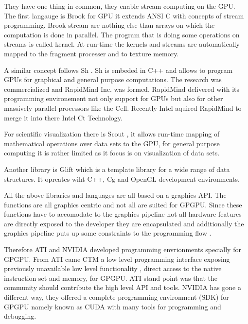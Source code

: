 They have one thing in common, they enable stream computing on the \gls{GPU}. The
first langauge is Brook\citep{Buck:2004} for \gls{GPU} it extends \gls{ANSI} C
with concepts of stream programming. Brook stream are nothing else than arrays
on which the computation is done in parallel. The program that is doing some
operations on streams is called kernel. At run-time the kernels and streams are
automatically mapped to the fragment processer and to texture memory. 

A similar concept follows Sh \citep{citeulike:6661860}. Sh is embeded in C++ 
and allows to program \glspl{GPU} for graphical and general purpose computations. 
The research was commercialized and RapidMind Inc. was formed. RapidMind delivered
with its programming environement not only support for \glspl{GPU} but also for
other massively parallel processors like the Cell. Recently Intel aquired RapidMind
to merge it into there Intel Ct Technology. 

For scientific visualization there is Scout \citep{citeulike:3145428},
it allows run-time mapping  of mathematical operations over data sets to the 
\gls{GPU}, for general purpose computing it is rather limited as it focus is on
visualization of data sets. 

Another library is Glift \citep{Lefohn:2006:GGE} which is a template library 
for a wide range of data structures. It opreates wiht C++, Cg and OpenGL 
development environments. 

All the above libraries and languages are all based on a graphics \gls{API}.
The functions are all graphics centric and not all are suited for \gls{GPGPU}.
Since these functions have to accomodate to the graphics pipeline not all
hardware features are directly exposed to the developer they are encapsulated
and additionally the graphics pipeline puts up some constraints to the
programming flow \citep{citeulike:1187394}.

Therefore \gls{ATI} and \gls{NVIDIA} developed programming envrionments
specially for \gls{GPGPU}. From \gls{ATI} came \gls{CTM} a low level programming
interface exposing previously unavailable low level functionality , direct
access to the native instruction set and memory, for \gls{GPGPU}. \Gls{ATI}
stand point was that the community should contribute the high level \gls{API}
and tools. \Gls{NVIDIA} has gone a different way, they offered a complete
programming environment (\gls{SDK}) for \gls{GPGPU} namely known as \gls{CUDA}
\citep{citeulike:3839013} with many tools for programming and debugging. 


